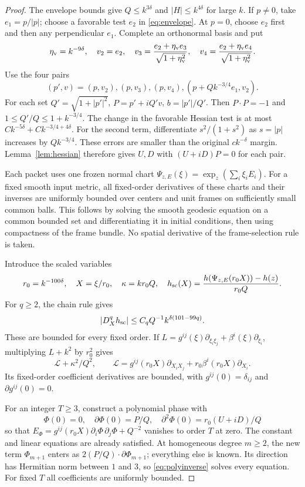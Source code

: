 \begin{proof}
The envelope bounds give \(Q\le k^{3\delta}\) and
\(|H|\le k^{4\delta}\) for large \(k\).
If \(p\ne0\), take \(e_1=p/|p|\); choose a favorable test \(e_2\)
in \eqref{eq:envelope}. At \(p=0\), choose \(e_2\) first and
then any perpendicular \(e_1\). Complete an orthonormal basis and put
\[
 \eta_{\rm v}=k^{-9\delta},\quad v_2=e_2,\quad
 v_3=\frac{e_2+\eta_{\rm v}e_3}{\sqrt{1+\eta_{\rm v}^2}},\quad
 v_4=\frac{e_2+\eta_{\rm v}e_4}{\sqrt{1+\eta_{\rm v}^2}}.
\]
Use the four pairs
\[
 (p',v)=(p,v_2),(p,v_3),(p,v_4),
             (p+Qk^{-3/4}e_1,v_2).
\]
For each set \(Q'=\sqrt{1+|p'|^2}\), \(P=p'+iQ'v\),
\(b=|p'|/Q'\). Then \(P\cdot P=-1\) and
\(1\le Q'/Q\le1+k^{-3/4}\).
The change in the favorable Hessian test is at most
\(Ck^{-5\delta}+Ck^{-3/4+4\delta}\).
For the second term, differentiate \(s^2/(1+s^2)\) as
\(s=|p|\) increases by \(Qk^{-3/4}\).
These errors are smaller than the original \(ck^{-\delta}\)
margin. Lemma~\ref{lem:hessian} therefore gives \(U,D\) with
\((U+iD)P=0\) for each pair.

Each packet uses one frozen normal chart
\(\Psi_{z,E}(\xi)=\exp_z(\sum_i\xi_iE_i)\).
For a fixed smooth input metric, all fixed-order derivatives of
these charts and their inverses are uniformly bounded over centers
and unit frames on sufficiently small common balls. This follows
by solving the smooth geodesic equation on a common bounded set
and differentiating it in initial conditions, then using compactness
of the frame bundle. No spatial derivative of the frame-selection
rule is taken.

Introduce the scaled variables
\begin{equation}\label{eq:scaling}
 r_0=k^{-100\delta},\quad X=\xi/r_0,\quad
 \kappa=kr_0Q,\quad
 h_{\rm sc}(X)=\frac{h(\Psi_{z,E}(r_0X))-h(z)}{r_0Q}.
\end{equation}
For \(q\ge2\), the chain rule gives
\[
 |D_X^q h_{\rm sc}|\le C_q Q^{-1}k^{\delta(101-99q)}.
\]
These are bounded for every fixed order. If
\(L=g^{ij}(\xi)\partial_{\xi_i\xi_j}
       +\beta^i(\xi)\partial_{\xi_i}\), multiplying \(L+k^2\)
by \(r_0^2\) gives
\[
 \mathcal L+\kappa^2/Q^2,\qquad
 \mathcal L=g^{ij}(r_0X)\partial_{X_iX_j}
                   +r_0\beta^i(r_0X)\partial_{X_i}.
\]
Its fixed-order coefficient derivatives are bounded, with
\(g^{ij}(0)=\delta_{ij}\) and \(\partial g^{ij}(0)=0\).

For an integer \(T\ge3\), construct a polynomial phase with
\[
 \Phi(0)=0,\quad \partial\Phi(0)=P/Q,\quad
 \partial^2\Phi(0)=r_0(U+iD)/Q
\]
so that
\(E_\Phi=g^{ij}(r_0X)\partial_i\Phi\,\partial_j\Phi+Q^{-2}\)
vanishes to order \(T\) at zero. The constant and linear equations
are already satisfied. At homogeneous degree \(m\ge2\), the new
term \(\Phi_{m+1}\) enters as
\(2(P/Q)\cdot\partial\Phi_{m+1}\); everything else is known.
Its direction has Hermitian norm between \(1\) and \(3\), so
\eqref{eq:polyinverse} solves every equation.
For fixed \(T\) all coefficients are uniformly bounded.


\end{proof}
